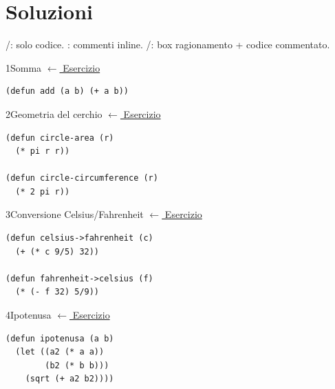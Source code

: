 ﻿%
\chapter*{Soluzioni}
\setcounter{solsec}{0}  %

\noindent\small\color{black!65}
\unaStella/\dueStelle: solo codice.\enspace
\treStelle: commenti inline.\enspace
\quattroStelle/\cinqueStelle: box ragionamento + codice commentato.
\color{black}

\vspace{8pt}


\label{sol:1}
\begin{solbox}{1}{Somma}
\small\color{black!55}\hyperref[ex:1]{$\leftarrow$ Esercizio}\normalsize\color{black}
\begin{lstlisting}
(defun add (a b) (+ a b))
\end{lstlisting}
\end{solbox}

\label{sol:2}
\begin{solbox}{2}{Geometria del cerchio}
\small\color{black!55}\hyperref[ex:2]{$\leftarrow$ Esercizio}\normalsize\color{black}
\begin{lstlisting}
(defun circle-area (r)
  (* pi r r))

(defun circle-circumference (r)
  (* 2 pi r))
\end{lstlisting}
\end{solbox}

\label{sol:3}
\begin{solbox}{3}{Conversione Celsius/Fahrenheit}
\small\color{black!55}\hyperref[ex:3]{$\leftarrow$ Esercizio}\normalsize\color{black}
\begin{lstlisting}
(defun celsius->fahrenheit (c)
  (+ (* c 9/5) 32))

(defun fahrenheit->celsius (f)
  (* (- f 32) 5/9))
\end{lstlisting}
\end{solbox}

\label{sol:4}
\begin{solbox}{4}{Ipotenusa}
\small\color{black!55}\hyperref[ex:4]{$\leftarrow$ Esercizio}\normalsize\color{black}
\begin{lstlisting}
(defun ipotenusa (a b)
  (let ((a2 (* a a))
        (b2 (* b b)))
    (sqrt (+ a2 b2))))
\end{lstlisting}
\end{solbox}


